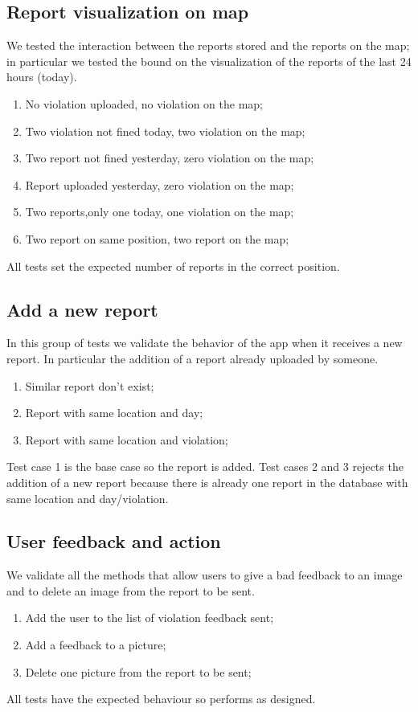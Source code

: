 \documentclass[../ITD.tex]{subfiles}
\begin{document}
    \subsection{Report visualization on map}\label{subsec:report-visualization-on-map}
    We tested the interaction between the reports stored and the reports on the map;
    in particular we tested the bound on the visualization of the reports of the last 24 hours (today).
    \begin{enumerate}
        \item No violation uploaded, no violation on the map;
        \item Two violation not fined today, two violation on the map;
        \item Two report not fined yesterday, zero violation on the map;
        \item Report uploaded yesterday, zero violation on the map;
        \item Two reports,only one today, one violation on the map;
        \item Two report on same position, two report on the map;
    \end{enumerate}
    All tests set the expected number of reports in the correct position.

    \subsection{Add a new report}\label{subsec:add-a-new-report}
    In this group of tests we validate the behavior of the app when it receives a new report.
    In particular the addition of a report already uploaded by someone.
    \begin{enumerate}
        \item Similar report don't exist;
        \item Report with same location and day;
        \item Report with same location and violation;
    \end{enumerate}
    Test case 1 is the base case so the report is added.
    \newline Test cases 2 and 3 rejects the addition of a new report because there is already one report in the database with same location and day/violation.

    \subsection{User feedback and action}\label{subsec:user-feedback-and-action}
    We validate all the methods that allow users to give a bad feedback to an image and to delete an image from the report to be sent.
    \begin{enumerate}
        \item Add the user to the list of violation feedback sent;
        \item Add a feedback to a picture;
        \item Delete one picture from the report to be sent;
    \end{enumerate}
    All tests have the expected behaviour so performs as designed.
\end{document}
